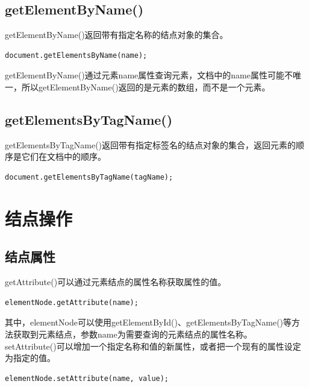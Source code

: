 \subsection{getElementByName()}

getElementByName()返回带有指定名称的结点对象的集合。 \\

\begin{lstlisting}[style=htmlcssjs]
document.getElementsByName(name);
\end{lstlisting}

getElementByName()通过元素name属性查询元素，文档中的name属性可能不唯一，所以getElementByName()返回的是元素的数组，而不是一个元素。

\subsection{getElementsByTagName()}

getElementsByTagName()返回带有指定标签名的结点对象的集合，返回元素的顺序是它们在文档中的顺序。 \\

\begin{lstlisting}[style=htmlcssjs]
document.getElementsByTagName(tagName);
\end{lstlisting}

\newpage

\section{结点操作}

\subsection{结点属性}

getAttribute()可以通过元素结点的属性名称获取属性的值。 \\

\begin{lstlisting}[style=htmlcssjs]
elementNode.getAttribute(name);
\end{lstlisting}

其中，elementNode可以使用getElementById()、getElementsByTagName()等方法获取到元素结点，参数name为需要查询的元素结点的属性名称。 \\

setAttribute()可以增加一个指定名称和值的新属性，或者把一个现有的属性设定为指定的值。 \\

\begin{lstlisting}[style=htmlcssjs]
elementNode.setAttribute(name, value);
\end{lstlisting}

